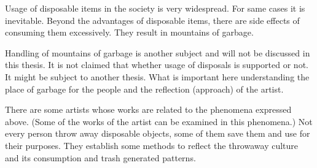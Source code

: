 Usage of disposable items in the society is very widespread. For same cases it is inevitable. Beyond the advantages of disposable items, there are side effects of consuming them excessively. They result in mountains of garbage.

Handling of mountains of garbage is another subject and will not be discussed in this thesis. It is not claimed that whether usage of disposals is supported or not. It might be subject to another thesis. What is important here understanding the place of garbage for the people and the reflection (approach) of the artist. 







%
%
There are some artists whose works are related to the phenomena expressed above. (Some of the works of the artist can be examined in this phenomena.) Not every person throw away disposable objects, some of them save them and use for their purposes. They establish some methods to reflect the throwaway culture and its consumption and trash generated patterns. 


